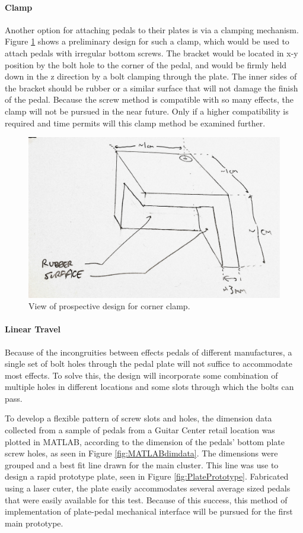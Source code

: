 \documentclass{article}
\begin{document}
			\paragraph{Clamp}
			Another option for attaching pedals to their plates is via a clamping mechanism.  Figure \ref{fig:CornerClamp} shows a preliminary design for such a clamp, which would be used to attach pedals with irregular bottom screws.  The bracket would be located in x-y position by the bolt hole to the corner of the pedal, and would be firmly held down in the z direction by a bolt clamping through the plate. The inner sides of the bracket should be rubber or a similar surface that will not damage the finish of the pedal.  Because the screw method is compatible with so many effects, the clamp will not be pursued in the near future.  Only if a higher compatibility is required and time permits will this clamp method be examined further. 

			\begin{figure}
				\centering
				\includegraphics[width = 0.3 \textwidth]{PR2Images/CornerBracketPerspective.jpg}
				\caption{View of prospective design for corner clamp.}
				\label{fig:CornerClamp}
			\end{figure}

			\paragraph{Linear Travel}
			Because of the incongruities between effects pedals of different manufactures, a single set of bolt holes through the pedal plate will not suffice to accommodate most effects.  To solve this, the design will incorporate some combination of multiple holes in different locations and some slots through which the bolts can pass.
			
			To develop a flexible pattern of screw slots and holes, the dimension data collected from a sample of pedals from a Guitar Center retail location \cite{MyPedalData} was plotted in MATLAB, according to the dimension of the pedals' bottom plate screw holes, as seen in Figure \ref{fig:MATLABdimdata}.  The dimensions were grouped and a best fit line drawn for the main cluster.  This line was use to design a rapid prototype plate, seen in Figure \ref{fig:PlatePrototype}.  Fabricated using a laser cuter, the plate easily accommodates several average sized pedals that were easily available for this test.  Because of this success, this method of implementation of plate-pedal mechanical interface will be pursued for the first main prototype.
\end{document}
